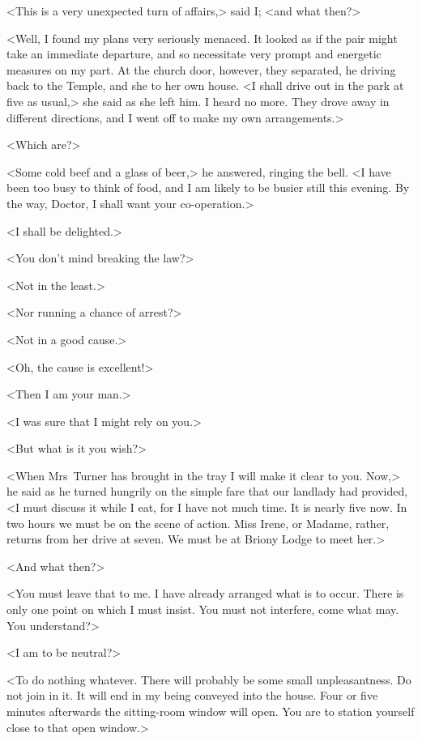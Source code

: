 <This is a very unexpected turn of affairs,> said I; <and what then?>

<Well, I found my plans very seriously menaced. It looked as if the pair might take an immediate departure, and so necessitate very prompt and energetic measures on my part. At the church door, however, they separated, he driving back to the Temple, and she to her own house. <I shall drive out in the park at five as usual,> she said as she left him. I heard no more. They drove away in different directions, and I went off to make my own arrangements.>

<Which are?>

<Some cold beef and a glass of beer,> he answered, ringing the bell. <I have been too busy to think of food, and I am likely to be busier still this evening. By the way, Doctor, I shall want your co-operation.>

<I shall be delighted.>

<You don't mind breaking the law?>

<Not in the least.>

<Nor running a chance of arrest?>

<Not in a good cause.>

<Oh, the cause is excellent!>

<Then I am your man.>

<I was sure that I might rely on you.>

<But what is it you wish?>

<When Mrs~Turner has brought in the tray I will make it clear to you. Now,> he said as he turned hungrily on the simple fare that our landlady had provided, <I must discuss it while I eat, for I have not much time. It is nearly five now. In two hours we must be on the scene of action. Miss Irene, or Madame, rather, returns from her drive at seven. We must be at Briony Lodge to meet her.>

<And what then?>

<You must leave that to me. I have already arranged what is to occur. There is only one point on which I must insist. You must not interfere, come what may. You understand?>

<I am to be neutral?>

<To do nothing whatever. There will probably be some small unpleasantness. Do not join in it. It will end in my being conveyed into the house. Four or five minutes afterwards the sitting-room window will open. You are to station yourself close to that open window.>

